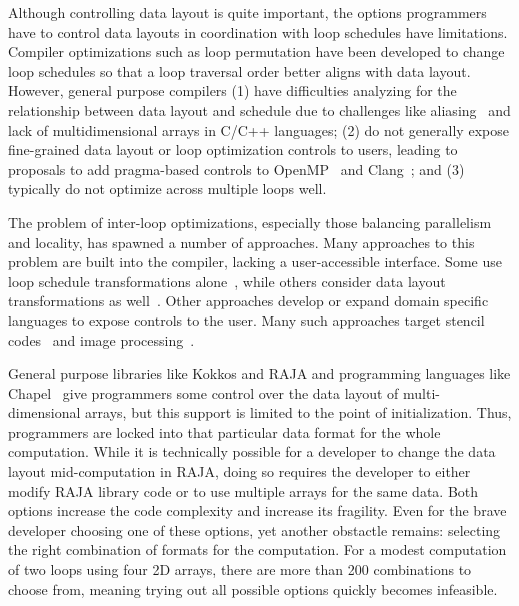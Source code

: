 \documentclass[sigconf]{acmart}
\begin{document}
Although controlling data layout is quite important, the options programmers have to control
data layouts in coordination with loop schedules have limitations.
Compiler optimizations such as loop permutation have been developed to change loop
schedules so that a loop traversal order better aligns with data layout.
However, general purpose compilers 
(1) have difficulties analyzing for the relationship between
data layout and schedule due to challenges like aliasing~\cite{hind2001pointer} and lack of multidimensional arrays in 
C/C++ languages; 
(2) do not generally expose fine-grained data layout or loop optimization
controls to users, leading to proposals to add pragma-based controls to OpenMP~\cite{kruse2019design} and Clang~\cite{kruse2018user}; and 
(3) typically do not optimize across multiple loops well.

The problem of inter-loop optimizations, especially those balancing parallelism and locality, has spawned a number of approaches. 
Many approaches to this problem are built into the compiler, lacking a user-accessible interface.
Some use loop schedule transformations alone~\cite{wolf1991data,mckinley1996improving}, while others consider data layout transformations as well~\cite{cierniak1995unifying,kennedy1995automatic,kandemir1998improving,  chen2005constraint, chen2005integrating, ozturk2011data}.
Other approaches develop or expand domain specific languages to expose controls to the user.
Many such approaches target stencil codes~\cite{henretty2011data,kronawitter2018automatic,luporini2018design} and image processing~\cite{ragan-kelley2013halide,mullapudi2015polymage}.

General purpose libraries like Kokkos and RAJA and programming languages like Chapel~\cite{diaconescu2007approach} give programmers some control over the data layout of multi-dimensional arrays, but this support is limited to the point of initialization.
Thus, programmers are locked into that particular data format for the whole computation.
While it is technically possible for a developer to change the data layout mid-computation in RAJA, doing so requires the developer to either modify RAJA library code or to use multiple arrays for the same data. 
Both options increase the code complexity and increase its fragility.
Even for the brave developer choosing one of these options, yet another obstactle remains: selecting the right combination of formats for the computation.
For a modest computation of two loops using four 2D arrays, there are more than 200 combinations to choose from, meaning trying out all possible options quickly becomes infeasible. 
\end{document}
